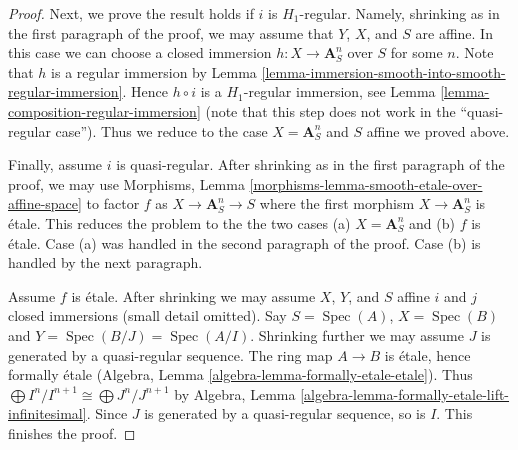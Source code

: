 \documentclass[10pt,a4paper]{amsart}
\theoremstyle{plain}
\theoremstyle{definition}
\theoremstyle{remark}
\numberwithin{equation}{subsection}
\def\Spec{\mathop{\mathrm{Spec}}}
\begin{document}
\begin{proof}
\medskip\noindent
Next, we prove the result holds if $i$ is $H_1$-regular.
Namely, shrinking as in the first paragraph of the proof, we may assume that
$Y$, $X$, and $S$ are affine. In this case we can choose a closed
immersion $h : X \to \mathbf{A}^n_S$ over $S$ for some $n$. Note that
$h$ is a regular immersion by
Lemma \ref{lemma-immersion-smooth-into-smooth-regular-immersion}.
Hence $h \circ i$ is a $H_1$-regular immersion, see
Lemma \ref{lemma-composition-regular-immersion} (note that this step
does not work in the ``quasi-regular case'').
Thus we reduce to the case $X = \mathbf{A}^n_S$ and $S$ affine
we proved above.

\medskip\noindent
Finally, assume $i$ is quasi-regular. After shrinking as in the first
paragraph of the proof, we may use Morphisms, Lemma
\ref{morphisms-lemma-smooth-etale-over-affine-space}
to factor $f$ as $X \to \mathbf{A}^n_S \to S$ where the first
morphism $X \to \mathbf{A}^n_S$ is \'etale. This reduces the problem
to the the two cases (a) $X = \mathbf{A}^n_S$ and (b) $f$ is \'etale.
Case (a) was handled in the second paragraph of the proof.
Case (b) is handled by the next paragraph.

\medskip\noindent
Assume $f$ is \'etale. After shrinking we may assume $X$, $Y$, and $S$
affine $i$ and $j$ closed immersions (small detail omitted).
Say $S = \Spec(A)$, $X = \Spec(B)$ and $Y = \Spec(B/J) = \Spec(A/I)$.
Shrinking further we may assume $J$ is generated by a quasi-regular sequence.
The ring map $A \to B$ is \'etale, hence formally \'etale
(Algebra, Lemma \ref{algebra-lemma-formally-etale-etale}).
Thus $\bigoplus I^n/I^{n + 1} \cong \bigoplus J^n/J^{n + 1}$
by Algebra, Lemma \ref{algebra-lemma-formally-etale-lift-infinitesimal}.
Since $J$ is generated by a quasi-regular sequence, so is $I$.
This finishes the proof.
\end{proof}
\end{document}
